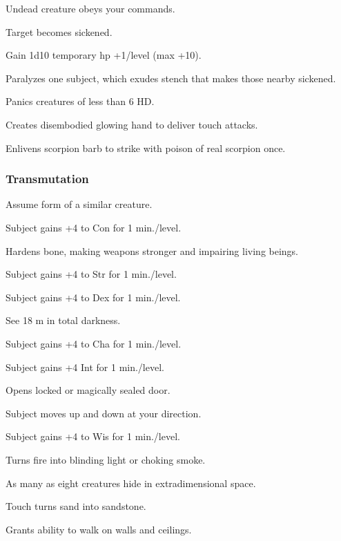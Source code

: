 	 Undead creature obeys your commands.

	 Target becomes sickened. %

	 Gain 1d10 temporary hp +1/level (max +10).

	 Paralyzes one subject, which exudes stench that makes those nearby sickened.

	 Panics creatures of less than 6 HD.

	 Creates disembodied glowing hand to deliver touch attacks.

	 Enlivens scorpion barb to strike with poison of real scorpion once. %

\subsubsection{Transmutation}
	 Assume form of a similar creature.

	 Subject gains +4 to Con for 1 min./level.

	 Hardens bone, making weapons stronger and impairing living beings. %

	 Subject gains +4 to Str for 1 min./level.

	 Subject gains +4 to Dex for 1 min./level.

	 See 18 m in total darkness.

	 Subject gains +4 to Cha for 1 min./level.

	 Subject gains +4 Int for 1 min./level.

	 Opens locked or magically sealed door.

	 Subject moves up and down at your direction.

	 Subject gains +4 to Wis for 1 min./level.

	 Turns fire into blinding light or choking smoke.

	 As many as eight creatures hide in extradimensional space.

	 Touch turns sand into sandstone. %

	 Grants ability to walk on walls and ceilings.

